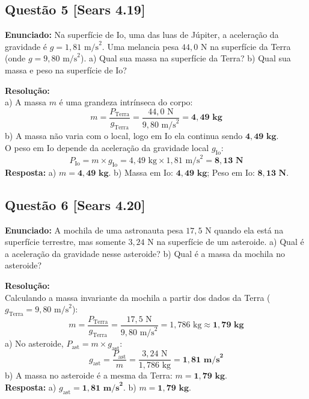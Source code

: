 \documentclass[11pt,a4paper]{article}
\begin{document}
\vspace{0.3cm}
\subsection*{Questão 5 [Sears 4.19]}
\textbf{Enunciado:} Na superfície de Io, uma das luas de Júpiter, a aceleração da gravidade é $g = 1,81\text{ m/s}^2$. Uma melancia pesa $44,0\text{ N}$ na superfície da Terra (onde $g = 9,80\text{ m/s}^2$). a) Qual sua massa na superfície da Terra? b) Qual sua massa e peso na superfície de Io?

\noindent
\textbf{Resolução:}\\
a) A massa $m$ é uma grandeza intrínseca do corpo:
\[ m = \frac{P_{\text{Terra}}}{g_{\text{Terra}}} = \frac{44,0\text{ N}}{9,80\text{ m/s}^2} = \mathbf{4,49\text{ kg}} \]
b) A massa não varia com o local, logo em Io ela continua sendo $\mathbf{4,49\text{ kg}}$.\\
O peso em Io depende da aceleração da gravidade local $g_{\text{Io}}$:
\[ P_{\text{Io}} = m \times g_{\text{Io}} = 4,49\text{ kg} \times 1,81\text{ m/s}^2 = \mathbf{8,13\text{ N}} \]
\textbf{Resposta:} a) $m = \mathbf{4,49\text{ kg}}$. b) Massa em Io: $\mathbf{4,49\text{ kg}}$; Peso em Io: $\mathbf{8,13\text{ N}}$.

\vspace{0.3cm}
\subsection*{Questão 6 [Sears 4.20]}
\textbf{Enunciado:} A mochila de uma astronauta pesa $17,5\text{ N}$ quando ela está na superfície terrestre, mas somente $3,24\text{ N}$ na superfície de um asteroide. a) Qual é a aceleração da gravidade nesse asteroide? b) Qual é a massa da mochila no asteroide?

\noindent
\textbf{Resolução:}\\
Calculando a massa invariante da mochila a partir dos dados da Terra ($g_{\text{Terra}} = 9,80\text{ m/s}^2$):
\[ m = \frac{P_{\text{Terra}}}{g_{\text{Terra}}} = \frac{17,5\text{ N}}{9,80\text{ m/s}^2} = 1,786\text{ kg} \approx \mathbf{1,79\text{ kg}} \]
a) No asteroide, $P_{\text{ast}} = m \times g_{\text{ast}}$:
\[ g_{\text{ast}} = \frac{P_{\text{ast}}}{m} = \frac{3,24\text{ N}}{1,786\text{ kg}} = \mathbf{1,81\text{ m/s}^2} \]
b) A massa no asteroide é a mesma da Terra: $m = \mathbf{1,79\text{ kg}}$.\\
\textbf{Resposta:} a) $g_{\text{ast}} = \mathbf{1,81\text{ m/s}^2}$. b) $m = \mathbf{1,79\text{ kg}}$.
\end{document}
